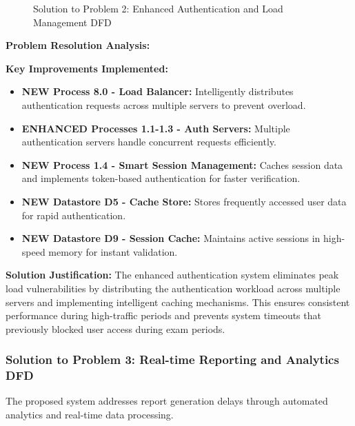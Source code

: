 \documentclass[12pt,a4paper,oneside]{book}
\begin{document}
\begin{figure}[H]
{
    }
    \caption{Solution to Problem 2: Enhanced Authentication and Load Management DFD}
\end{figure}

\textbf{Problem Resolution Analysis:}

\textbf{Key Improvements Implemented:}
\begin{itemize}
    \item \textbf{NEW Process 8.0 - Load Balancer:} Intelligently distributes authentication requests across multiple servers to prevent overload.
    \item \textbf{ENHANCED Processes 1.1-1.3 - Auth Servers:} Multiple authentication servers handle concurrent requests efficiently.
    \item \textbf{NEW Process 1.4 - Smart Session Management:} Caches session data and implements token-based authentication for faster verification.
    \item \textbf{NEW Datastore D5 - Cache Store:} Stores frequently accessed user data for rapid authentication.
    \item \textbf{NEW Datastore D9 - Session Cache:} Maintains active sessions in high-speed memory for instant validation.
\end{itemize}

\textbf{Solution Justification:}
The enhanced authentication system eliminates peak load vulnerabilities by distributing the authentication workload across multiple servers and implementing intelligent caching mechanisms. This ensures consistent performance during high-traffic periods and prevents system timeouts that previously blocked user access during exam periods.

\subsubsection{Solution to Problem 3: Real-time Reporting and Analytics DFD}

The proposed system addresses report generation delays through automated analytics and real-time data processing.
\end{document}
